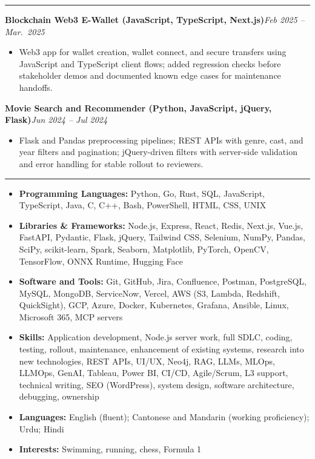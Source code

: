 \documentclass[9pt,a4paper]{article}
\newcommand{\ressection}[1]{%
  \vspace{0.8em}%
  \noindent{\large\scshape\bfseries #1}\par\nobreak
  \vspace{-\parskip}%
  \noindent\rule{\linewidth}{0.1pt}\par\nobreak
  \vspace{-\parskip}%
}
\newcommand{\resumeHeading}[2]{%
  \vspace{0.6em}%
  \noindent\textbf{\small #1}\hfill\textit{\small #2}\par\vspace{0.28em}}
\begin{document}
\ressection{Projects}

\resumeHeading{Blockchain Web3 E-Wallet (JavaScript, TypeScript, Next.js)}{Feb 2025 -- Mar.\ 2025}
\begin{itemize}
  \item Web3 app for wallet creation, wallet connect, and secure transfers using JavaScript and TypeScript client flows; added regression checks before stakeholder demos and documented known edge cases for maintenance handoffs.
\end{itemize}

\resumeHeading{Movie Search and Recommender (Python, JavaScript, jQuery, Flask)}{Jun 2024 -- Jul 2024}
\begin{itemize}
  \item Flask and Pandas preprocessing pipelines; REST APIs with genre, cast, and year filters and pagination; jQuery-driven filters with server-side validation and error handling for stable rollout to reviewers.
\end{itemize}

\ressection{Skills and Interests}
\begin{itemize}
  \item \textbf{Programming Languages:} Python, Go, Rust, SQL, JavaScript, TypeScript, Java, C, C++, Bash, PowerShell, HTML, CSS, UNIX
  \item \textbf{Libraries \& Frameworks:} Node.js, Express, React, Redis, Next.js, Vue.js, FastAPI, Pydantic, Flask, jQuery, Tailwind CSS, Selenium, NumPy, Pandas, SciPy, scikit-learn, Spark, Seaborn, Matplotlib, PyTorch, OpenCV, TensorFlow, ONNX Runtime, Hugging Face
  \item \textbf{Software and Tools:} Git, GitHub, Jira, Confluence, Postman, PostgreSQL, MySQL, MongoDB, ServiceNow, Vercel, AWS (S3, Lambda, Redshift, QuickSight), GCP, Azure, Docker, Kubernetes, Grafana, Ansible, Linux, Microsoft 365, MCP servers
  \item \textbf{Skills:} Application development, Node.js server work, full SDLC, coding, testing, rollout, maintenance, enhancement of existing systems, research into new technologies, REST APIs, UI/UX, Neo4j, RAG, LLMs, MLOps, LLMOps, GenAI, Tableau, Power BI, CI/CD, Agile/Scrum, L3 support, technical writing, SEO (WordPress), system design, software architecture, debugging, ownership
  \item \textbf{Languages:} English (fluent); Cantonese and Mandarin (working proficiency); Urdu; Hindi
  \item \textbf{Interests:} Swimming, running, chess, Formula 1
\end{itemize}
\end{document}
